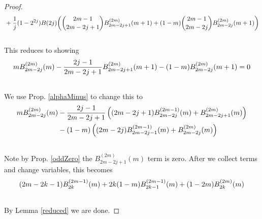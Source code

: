 \documentclass[fleqn,a4paper,9pt]{article}
\begin{document}
\begin{flushleft}
\begin{proof}
\begin{align}
&+\frac{1}{j}(1-2^{2j})B(2j)\biggl(\binom{2m-1}{2m-2j+1}B_{2m-2j+1}^{(2m)}(m+1)+(1-m)\binom{2m-1}{2m-2j}B_{2m-2j}^{(2m)}(m+1)\biggr)\\\notag
\end{align}
This reduces to showing
\begin{align}
mB_{2m-2j}^{(2m)}(m) -\frac{2j-1}{2m-2j+1}B_{2m-2j+1}^{(2m)}(m+1)-(1-m)B_{2m-2j}^{(2m)}(m+1)=0\\\notag
\end{align}
We use Prop. \ref{alphaMinus} to change this to
\begin{align}
mB_{2m-2j}^{(2m)}(m)& -\frac{2j-1}{2m-2j+1}\left((2m-2j+1)B_{2m-2j}^{(2m-1)}(m)+B_{2m-2j+1}^{(2m)}(m)\right)\\\notag
&-(1-m)\left((2m-2j)B_{2m-2j-1}^{(2m-1)}(m)+B_{2m-2j}^{(2m)}(m)\right)\\\notag
\end{align}
Note by Prop. \ref{oddZero} the $B_{2m-2j+1}^{(2m)}(m)$ term is zero.  After we collect terms and change variables, this becomes
\begin{align}
(2m-2k-1)B_{2k}^{(2m-1)}(m)+2k(1-m)B_{2k-1}^{(2m-1)}(m)+(1-2m)B_{2k}^{(2m)}(m)\\\notag
\end{align}
By Lemma \ref{reduced} we are done.
\end{proof}

\end{flushleft}
\end{document}
